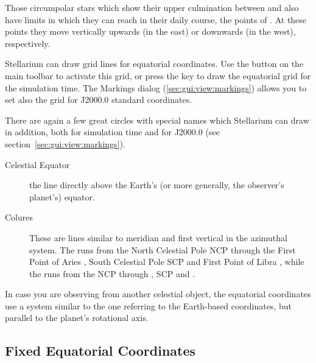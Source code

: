Those circumpolar stars which show their upper culmination between
 and  also have
limits in  which they can reach in their daily course,
 the points of . At these points they move vertically
upwards (in the east) or downwards (in the west), respectively.

Stellarium can draw grid lines for equatorial coordinates. Use the
button  on the main toolbar to activate
this grid, or press the  key to draw the equatorial grid for
the simulation time. The Markings dialog (\ref{sec:gui:view:markings})
allows you to set also the grid for J2000.0 standard coordinates.

There are again a few great circles with special names which
Stellarium can draw in addition, both for simulation time and for
J2000.0 (see section~\ref{sec:gui:view:markings}).
\begin{description}
\item[Celestial Equator] the line directly above the Earth's (or more
  generally, the observer's planet's) equator.
\item[Colures] These are lines similar to meridian and first vertical
  in the azimuthal system. The  runs from the
  North Celestial Pole NCP through the First Point of Aries \Aries,
  South Celestial Pole SCP and First Point of Libra \Libra, while the
   runs from the NCP through  \Cancer, SCP and  \Capricorn.
\end{description}

In case you are observing from another celestial object, the
equatorial coordinates use a system similar to the one referring to
the Earth-based coordinates, but parallel to the planet's rotational
axis.

\subsection{Fixed Equatorial Coordinates}
\label{sec:Concepts:FixedEquatorial}

